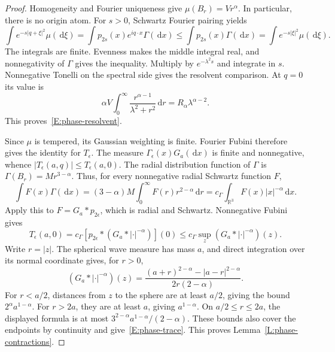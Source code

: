 \documentclass[12pt]{article}
\numberwithin{equation}{section}
\theoremstyle{definition}
\newcommand{\R}{\mathbb{R}}
\newcommand{\ud}{\,\mathrm{d}}
\begin{document}
\begin{proof}
  Homogeneity and Fourier uniqueness give
  $\mu(B_r)=Vr^\alpha$. In particular, there is no origin atom.
  For $s>0$, Schwartz Fourier pairing yields
  \[
    \int e^{-s|q+\xi|^2}\mu(\ud\xi)
    =\int p_{2s}(x)e^{iq\cdot x}\Gamma(\ud x)
    \le\int p_{2s}(x)\Gamma(\ud x)
    =\int e^{-s|\xi|^2}\mu(\ud\xi).
  \]
  The integrals are finite. Evenness makes the middle integral real,
  and nonnegativity of $\Gamma$ gives the inequality. Multiply by
  $e^{-\lambda^2s}$ and integrate in $s$. Nonnegative Tonelli on
  the spectral side gives the resolvent comparison. At $q=0$ its
  value is
  \[
    \alpha V\int_0^\infty\frac{r^{\alpha-1}}{\lambda^2+r^2}\ud r
    =R_\alpha\lambda^{\alpha-2}.
  \]
  This proves~\eqref{E:phase-resolvent}.

  Since $\mu$ is tempered, its Gaussian weighting is finite. Fourier
  Fubini therefore gives the identity for $T_\epsilon$. The measure
  $\Gamma_\epsilon(x)G_a(\ud x)$ is finite and nonnegative, whence
  $|T_\epsilon(a,q)|\le T_\epsilon(a,0)$.
  The radial distribution function of $\Gamma$ is
  $\Gamma(B_r)=Mr^{3-\alpha}$. Thus, for every nonnegative radial
  Schwartz function $F$,
  \[
    \int F(x)\Gamma(\ud x)
    =(3-\alpha)M\int_0^\infty F(r)r^{2-\alpha}\ud r
    =c_\Gamma\int_{\R^3}F(x)|x|^{-\alpha}\ud x.
  \]
  Apply this to $F=G_a*p_{2\epsilon}$, which is radial and Schwartz.
  Nonnegative Fubini gives
  \[
    T_\epsilon(a,0)
    =c_\Gamma[p_{2\epsilon}*(G_a*|\cdot|^{-\alpha})](0)
    \le c_\Gamma\sup_z(G_a*|\cdot|^{-\alpha})(z).
  \]
  Write $r=|z|$. The spherical wave measure has mass $a$, and direct
  integration over its normal coordinate gives, for $r>0$,
  \[
    (G_a*|\cdot|^{-\alpha})(z)
    =\frac{(a+r)^{2-\alpha}-|a-r|^{2-\alpha}}
    {2r(2-\alpha)}.
  \]
  For $r<a/2$, distances from $z$ to the sphere are at least $a/2$,
  giving the bound $2^\alpha a^{1-\alpha}$. For $r>2a$, they are
  at least $a$, giving $a^{1-\alpha}$. On $a/2\le r\le2a$, the
  displayed formula is at most
  $3^{2-\alpha}a^{1-\alpha}/(2-\alpha)$. These bounds also cover
  the endpoints by continuity and give~\eqref{E:phase-trace}.
  This proves Lemma~\ref{L:phase-contractions}.
\end{proof}
\end{document}
